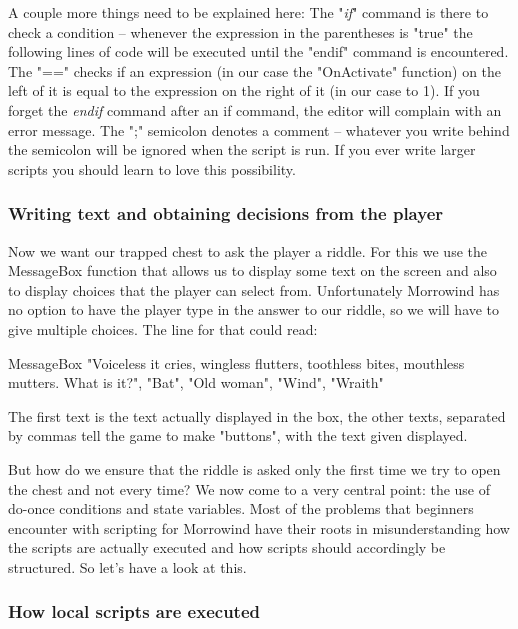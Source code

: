 \documentclass[
]{article}
\begin{document}


A couple more things need to be explained here: The "\emph{if}" command
is there to check a condition -- whenever the expression in the
parentheses is "true" the following lines of code will be executed until
the "endif" command is encountered. The "==" checks if an expression (in
our case the "OnActivate" function) on the left of it is equal to the
expression on the right of it (in our case to 1). If you forget the
\emph{endif} command after an if command, the editor will complain with
an error message. The ";" semicolon denotes a comment -- whatever you
write behind the semicolon will be ignored when the script is run. If
you ever write larger scripts you should learn to love this possibility.

\hypertarget{writing-text-and-obtaining-decisions-from-the-player}{%
\subsubsection{Writing text and obtaining decisions from the
player}\label{writing-text-and-obtaining-decisions-from-the-player}}

Now we want our trapped chest to ask the player a riddle. For this we
use the MessageBox function that allows us to display some text on the
screen and also to display choices that the player can select from.
Unfortunately Morrowind has no option to have the player type in the
answer to our riddle, so we will have to give multiple choices. The line
for that could read:

MessageBox "Voiceless it cries, wingless flutters, toothless bites,
mouthless mutters. What is it?", "Bat", "Old woman", "Wind", "Wraith"

The first text is the text actually displayed in the box, the other
texts, separated by commas tell the game to make "buttons", with the
text given displayed.

But how do we ensure that the riddle is asked only the first time we try
to open the chest and not every time? We now come to a very central
point: the use of do-once conditions and state variables. Most of the
problems that beginners encounter with scripting for Morrowind have
their roots in misunderstanding how the scripts are actually executed
and how scripts should accordingly be structured. So let's have a look
at this.

\hypertarget{how-local-scripts-are-executed}{%
\subsubsection{How local scripts are
executed}\label{how-local-scripts-are-executed}}
\end{document}
